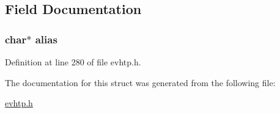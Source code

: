 \subsection{Field Documentation}
\hypertarget{structevhtp__alias__s_a9027b352db4085a0122952932d065705}{
\subsubsection[{alias}]{\setlength{\rightskip}{0pt plus 5cm}char$\ast$ alias}}\label{structevhtp__alias__s_a9027b352db4085a0122952932d065705}


Definition at line 280 of file evhtp.\-h.



The documentation for this struct was generated from the following file\-:\begin{DoxyCompactItemize}
\item 
\hyperlink{evhtp_8h}{evhtp.\-h}\end{DoxyCompactItemize}
